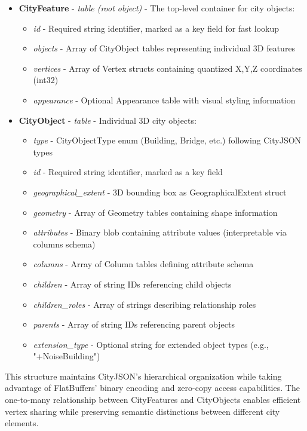 \begin{itemize}
  \item \textbf{CityFeature} - \textit{table (root object)} - The top-level container for city objects:
    \begin{itemize}
      \item \textit{id} - Required string identifier, marked as a key field for fast lookup
      \item \textit{objects} - Array of CityObject tables representing individual 3D features
      \item \textit{vertices} - Array of Vertex structs containing quantized X,Y,Z coordinates (int32)
      \item \textit{appearance} - Optional Appearance table with visual styling information
    \end{itemize}

  \item \textbf{CityObject} - \textit{table} - Individual 3D city objects:
    \begin{itemize}
      \item \textit{type} - CityObjectType enum (Building, Bridge, etc.) following CityJSON types \citep{cityjson_spec}
      \item \textit{id} - Required string identifier, marked as a key field
      \item \textit{geographical\_extent} - 3D bounding box as GeographicalExtent struct
      \item \textit{geometry} - Array of Geometry tables containing shape information
      \item \textit{attributes} - Binary blob containing attribute values (interpretable via columns schema)
      \item \textit{columns} - Array of Column tables defining attribute schema
      \item \textit{children} - Array of string IDs referencing child objects
      \item \textit{children\_roles} - Array of strings describing relationship roles
      \item \textit{parents} - Array of string IDs referencing parent objects
      \item \textit{extension\_type} - Optional string for extended object types (e.g., "+NoiseBuilding")
    \end{itemize}
\end{itemize}

This structure maintains CityJSON's hierarchical organization while taking advantage of FlatBuffers' binary encoding and zero-copy access capabilities. The one-to-many relationship between CityFeatures and CityObjects enables efficient vertex sharing while preserving semantic distinctions between different city elements.

